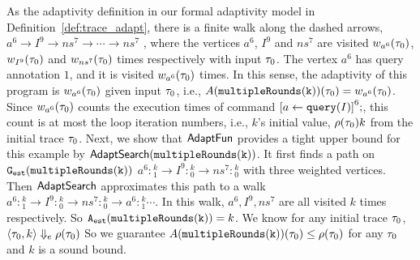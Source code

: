 \begin{example}
    As the adaptivity definition in our formal adaptivity model in Definition~\ref{def:trace_adapt},
    there is a finite walk along the dashed arrows,
    $a^{6} \to I^9 \to ns^{7} \to \cdots \to ns^7$ , 
    where the vertices $a^{6}$, $I^9$ and $ns^{7}$ are visited $w_{a^{6}}(\mathtt{\tau}_0)$,
    $w_{I^9}(\mathtt{\tau}_0)$ and $w_{ns^{7}}(\mathtt{\tau}_0)$
    times respectively with input $\mathtt{\tau}_0$.
    The vertex $a^{6}$ has query annotation $1$, and it is visited $w_{a^{6}}(\mathtt{\tau}_0)$ times.
    In this sense, the adaptivity of this program is
    $w_{a^{6}}(\mathtt{\tau}_0)$ given input $\mathtt{\tau}_0$, i.e., $A(\mathtt{multipleRounds(k)})(\mathtt{\tau}_0) = w_{a^{6}}(\mathtt{\tau}_0)$.
    Since $w_{a^{6}}(\mathtt{\tau}_0)$
    counts the execution times of command $\clabel{\assign{a}{\query(I)}}^6;$,
    this count is at most the loop iteration numbers, i.e., $k$'s initial value, $\rho(\mathtt{\tau}_0) k$ from the initial trace $\mathtt{\tau}_0$.
    {
    Next, we show that {$\textsf{AdaptFun}$} provides a tight upper bound for this example by $\mathsf{AdaptSearch}(\mathtt{multipleRounds(k)})$.
    It first finds a path on $\mathtt{{G_{est}}}(\mathtt{multipleRounds(k)})$
    $a^{6}: {}^k_1 \to I^9:{}^k_0 \to ns^7:{}^k_0$ with three weighted vertices. 
    Then $\mathsf{AdaptSearch}$ approximates this path to a walk $a^{6}: {}^k_1 \to I^9:{}^k_0 \to ns^7:{}^k_0 \to a^{6}: {}^k_1 \cdots$.
    In this walk, $a^6, I^9, ns^{7}$ are all visited $k$ times respectively. 
    So ${\mathtt{A_{est}}}(\mathtt{multipleRounds(k)}) = k$.
    We know for any initial trace $\mathtt{\tau}_0$, $\langle \mathtt{\tau}_0, k \rangle \Downarrow_e \rho(\mathtt{\tau}_0)$
    So we guarantee $A(\mathtt{multipleRounds(k)})(\mathtt{\tau}_0) \leq \rho(\mathtt{\tau}_0)$ for any $\mathtt{\tau}_0$
    and $k$ is a sound bound.
    }
    \end{example}
